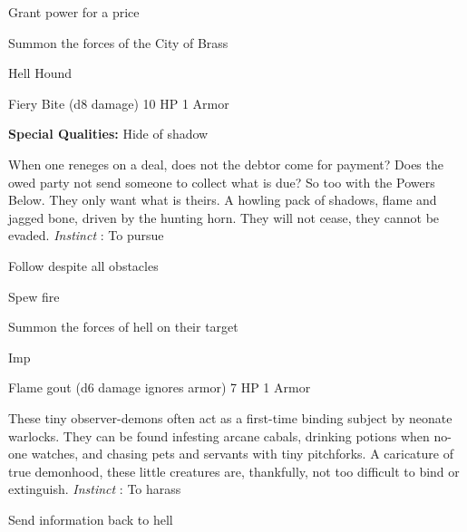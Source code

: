 \startitemize[1,packed]

\item Grant power for a price

 
\item Summon the forces of the City of Brass


\stopitemize
 
\startMonsterName
Hell Hound	 
\stopMonsterName
 

Fiery Bite (d8 damage)	10 HP	1 Armor

 


 
\startMonsterQualities
{\bf Special Qualities:}  Hide of shadow
\stopMonsterQualities
 
\startMonsterDescription
When one reneges on a deal, does not the debtor come for payment? Does the owed party not send someone to collect what is due? So too with the Powers Below. They only want what is theirs. A howling pack of shadows, flame and jagged bone, driven by the hunting horn. They will not cease, they cannot be evaded. {\em Instinct} : To pursue
\stopMonsterDescription
 
\startitemize[1,packed]

\item Follow despite all obstacles

 
\item Spew fire

 
\item Summon the forces of hell on their target


\stopitemize
 
\startMonsterName
Imp	 
\stopMonsterName
 

Flame gout (d6 damage ignores armor)	7 HP	1 Armor

 


 
\startMonsterDescription
These tiny observer-demons often act as a first-time binding subject by neonate warlocks. They can be found infesting arcane cabals, drinking potions when no-one watches, and chasing pets and servants with tiny pitchforks. A caricature of true demonhood, these little creatures are, thankfully, not too difficult to bind or extinguish. {\em Instinct} : To harass
\stopMonsterDescription
 
\startitemize[1,packed]

\item Send information back to hell

